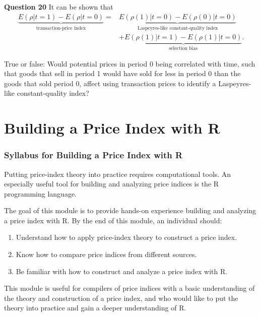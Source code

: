 \documentclass[
]{article}
\providecommand{\tightlist}{%
  \setlength{\itemsep}{0pt}\setlength{\parskip}{0pt}}
\begin{document}
\textbf{Question 20} It can be shown that
\begin{align*}
\underbrace{E(\rho | t = 1) - E(\rho | t = 0)}_{\text{transaction-price index}} =& \underbrace{E(\rho(1) | t = 0) - E(\rho(0) | t = 0)}_{\text{Laspeyres-like constant-quality index}} \\ 
&+ \underbrace{E(\rho(1) | t = 1) - E(\rho(1) | t = 0)}_{\text{selection bias}}.
\end{align*}

True or false: Would potential prices in period 0 being correlated with time, such that goods that sell in period 1 would have sold for less in period 0 than the goods that sold period 0, affect using transaction prices to identify a Laspeyres-like constant-quality index?

\hypertarget{part-building-a-price-index-with-r}{%
\part{Building a Price Index with R}\label{part-building-a-price-index-with-r}}

\hypertarget{syllabus-for-building-a-price-index-with-r}{%
\section{Syllabus for Building a Price Index with R}\label{syllabus-for-building-a-price-index-with-r}}

Putting price-index theory into practice requires computational tools. An especially useful tool for building and analyzing price indices is the R programming language.

The goal of this module is to provide hands-on experience building and analyzing a price index with R. By the end of this module, an individual should:

\begin{enumerate}
\def\labelenumi{\arabic{enumi}.}
\tightlist
\item
  Understand how to apply price-index theory to construct a price index.
\item
  Know how to compare price indices from different sources.
\item
  Be familiar with how to construct and analyze a price index with R.
\end{enumerate}

This module is useful for compilers of price indices with a basic understanding of the theory and construction of a price index, and who would like to put the theory into practice and gain a deeper understanding of R.
\end{document}

